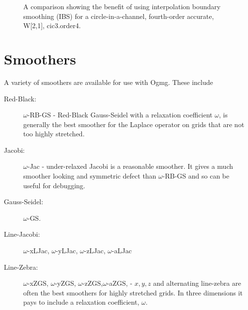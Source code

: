 \documentclass{article}
\begin{document}
{
\renewcommand{\figWidth}{6.cm}
\newcommand{\trimfig}[2]{\trimhb{#1}{#2}{.0}{.0}{.0}{.0}}
\begin{figure}[hbt]
\begin{center}
\end{center}
\caption{A comparison showing the benefit of using interpolation boundary smoothing (IBS)
 for a circle-in-a-channel, fourth-order accurate, W[2,1], cic3.order4.}
\label{fig:smoothInterp}
\end{figure}
}





\clearpage
\section{Smoothers}

  A variety of smoothers are available for use with Ogmg. These include
\begin{description}
  \item[Red-Black:] $\omega$-RB-GS - Red-Black Gauss-Seidel with a relaxation coefficient $\omega$,
     is generally the
     best smoother for the Laplace operator on grids that are not too highly stretched.
  \item[Jacobi:] $\omega$-Jac - under-relaxed Jacobi is a reasonable smoother. It gives a much smoother
     looking and symmetric defect than $\omega$-RB-GS and so can be useful for debugging.
  \item[Gauss-Seidel:] $\omega$-GS. 
  \item[Line-Jacobi:] $\omega$-xLJac, $\omega$-yLJac, $\omega$-zLJac, $\omega$-aLJac
  \item[Line-Zebra:] $\omega$-xZGS, $\omega$-yZGS, $\omega$-zZGS,$ \omega$-aZGS, - 
    $x,y,z$ and alternating line-zebra are often the best smoothers 
    for highly stretched grids. In three dimensions it pays to include a relaxation coefficient, $\omega$.
\end{description}
\end{document}
